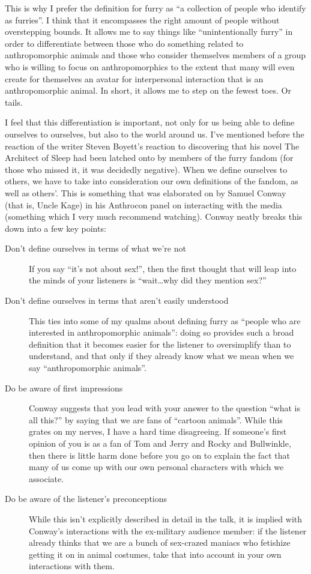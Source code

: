 This is why I prefer the definition for furry as ``a collection of people who identify as furries''. I think that it encompasses the right amount of people without overstepping bounds.  It allows me to say things like ``unintentionally furry'' in order to differentiate between those who do something related to anthropomorphic animals and those who consider themselves members of a group who is willing to focus on anthropomorphics to the extent that many will even create for themselves an avatar for interpersonal interaction that is an anthropomorphic animal.  In short, it allows me to step on the fewest toes.  Or tails.

I feel that this differentiation is important, not only for us being able to define ourselves to ourselves, but also to the world around us.  I've mentioned before the reaction of the writer Steven Boyett's reaction to discovering that his novel The Architect of Sleep had been latched onto by members of the furry fandom (for those who missed it, it was decidedly negative).  When we define ourselves to others, we have to take into consideration our own definitions of the fandom, as well as others'.  This is something that was elaborated on by Samuel Conway (that is, Uncle Kage) in his Anthrocon panel on interacting with the media (something which I very much recommend watching).  Conway neatly breaks this down into a few key points:

\begin{description}
  \item[Don't define ourselves in terms of what we're not] If you say ``it's not about sex!'', then the first thought that will leap into the minds of your listeners is ``wait\ldots why did they mention sex?''
  \item[Don't define ourselves in terms that aren't easily understood] This ties into some of my qualms about defining furry as ``people who are interested in anthropomorphic animals'': doing so provides such a broad definition that it becomes easier for the listener to oversimplify than to understand, and that only if they already know what we mean when we say ``anthropomorphic animals''.
  \item[Do be aware of first impressions] Conway suggests that you lead with your answer to the question ``what is all this?'' by saying that we are fans of ``cartoon animals''.  While this grates on my nerves, I have a hard time disagreeing.  If someone's first opinion of you is as a fan of Tom and Jerry and Rocky and Bullwinkle, then there is little harm done before you go on to explain the fact that many of us come up with our own personal characters with which we associate.
  \item[Do be aware of the listener's preconceptions] While this isn't explicitly described in detail in the talk, it is implied with Conway's interactions with the ex-military audience member: if the listener already thinks that we are a bunch of sex-crazed maniacs who fetishize getting it on in animal costumes, take that into account in your own interactions with them.
\end{description}

